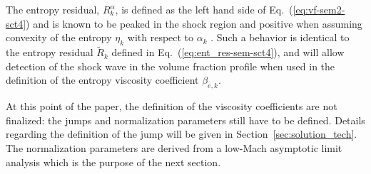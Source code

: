 \documentclass[preprint,10pt]{elsarticle}
\newcommand{\resi}{R}
\newcommand{\resinew}{\widetilde{\resi}}
\newcommand{\eqt}[1]{Eq.~(\ref{#1})}                     %
\newcommand{\sct}[1]{Section~\ref{#1}}                   %
\begin{document}
% 
The entropy residual, $R_{k}^\alpha$, is defined as the left hand side of \eqt{eq:vf-sem2-sct4} and is known to be peaked in the shock region and positive when assuming convexity of the entropy $\eta_k$ with respect to $\alpha_k$ \cite{Leveque}. Such a behavior is identical to the entropy residual $\resinew_k$ defined in \eqt{eq:ent_res-sem-sct4}, and will allow detection of the shock wave in the volume fraction profile when used in the definition of the entropy viscosity coefficient $\beta_{e,k}$.
%

At this point of the paper, the definition of the viscosity coefficients are not finalized: the jumps and normalization parameters still have to be defined. Details regarding the definition of the jump will be given in \sct{sec:solution_tech}. The normalization parameters are derived from a low-Mach asymptotic limit analysis which is the purpose of the next section.
\end{document}
